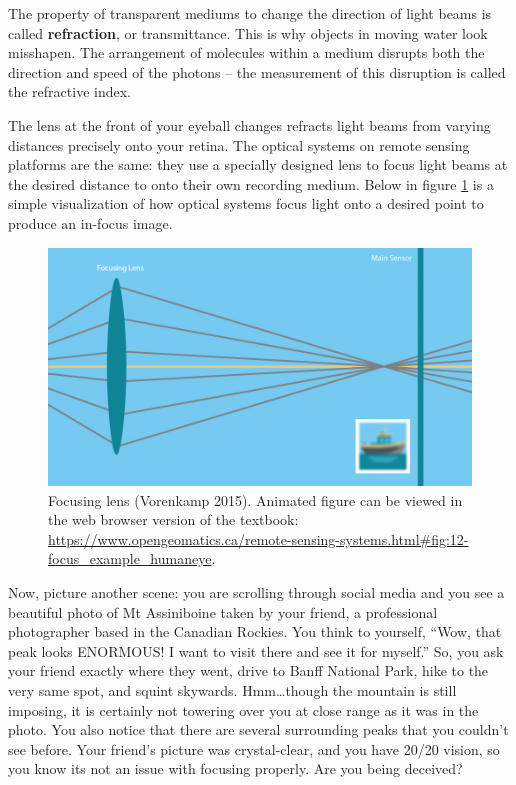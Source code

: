 \documentclass[
]{book}
\begin{document}
The property of transparent mediums to change the direction of light beams is called \textbf{refraction}, or transmittance. This is why objects in moving water look misshapen. The arrangement of molecules within a medium disrupts both the direction and speed of the photons -- the measurement of this disruption is called the refractive index.

The lens at the front of your eyeball changes refracts light beams from varying distances precisely onto your retina. The optical systems on remote sensing platforms are the same: they use a specially designed lens to focus light beams at the desired distance to onto their own recording medium. Below in figure \ref{fig:12-focus-example-humaneye} is a simple visualization of how optical systems focus light onto a desired point to produce an in-focus image.



\begin{figure}
\includegraphics[width=0.75\linewidth]{images/12-focus_example_humaneye-static} \caption{Focusing lens (Vorenkamp 2015). Animated figure can be viewed in the web browser version of the textbook: \url{https://www.opengeomatics.ca/remote-sensing-systems.html\#fig:12-focus_example_humaneye}.}\label{fig:12-focus-example-humaneye}
\end{figure}

Now, picture another scene: you are scrolling through social media and you see a beautiful photo of Mt Assiniboine taken by your friend, a professional photographer based in the Canadian Rockies. You think to yourself, ``Wow, that peak looks ENORMOUS! I want to visit there and see it for myself.'' So, you ask your friend exactly where they went, drive to Banff National Park, hike to the very same spot, and squint skywards. Hmm\ldots though the mountain is still imposing, it is certainly not towering over you at close range as it was in the photo. You also notice that there are several surrounding peaks that you couldn't see before. Your friend's picture was crystal-clear, and you have 20/20 vision, so you know its not an issue with focusing properly. Are you being deceived?
\end{document}
